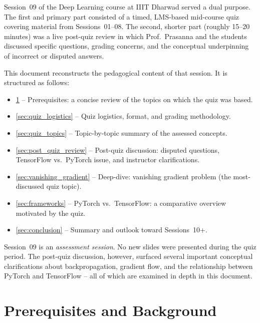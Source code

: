 \documentclass[12pt,a4paper]{article}
\begin{document}
Session~09 of the Deep Learning course at IIIT Dharwad served a dual
purpose.  The first and primary part consisted of a timed, LMS-based
mid-course quiz covering material from Sessions~01--08.  The second,
shorter part (roughly 15--20 minutes) was a live post-quiz review in
which Prof.\ Prasanna and the students discussed specific questions,
grading concerns, and the conceptual underpinning of incorrect or
disputed answers.

\medskip
\noindent
This document reconstructs the pedagogical content of that session.
It is structured as follows:
\begin{itemize}[leftmargin=1.5cm]
  \item \cref{sec:prereq} -- Prerequisites: a concise review of the
        topics on which the quiz was based.
  \item \cref{sec:quiz_logistics} -- Quiz logistics, format, and
        grading methodology.
  \item \cref{sec:quiz_topics} -- Topic-by-topic summary of the
        assessed concepts.
  \item \cref{sec:post_quiz_review} -- Post-quiz discussion: disputed
        questions, TensorFlow vs.\ PyTorch issue, and instructor
        clarifications.
  \item \cref{sec:vanishing_gradient} -- Deep-dive: vanishing gradient
        problem (the most-discussed quiz topic).
  \item \cref{sec:frameworks} -- PyTorch vs.\ TensorFlow: a comparative
        overview motivated by the quiz.
  \item \cref{sec:conclusion} -- Summary and outlook toward Sessions~10+.
\end{itemize}

\begin{keyinsight}
Session~09 is an \emph{assessment session}.  No new slides were presented
during the quiz period.  The post-quiz discussion, however, surfaced
several important conceptual clarifications about backpropagation,
gradient flow, and the relationship between PyTorch and TensorFlow --
all of which are examined in depth in this document.
\end{keyinsight}

\section{Prerequisites and Background}
\label{sec:prereq}
\end{document}
